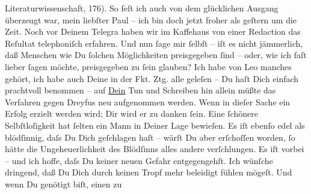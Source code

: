 \begin{ledgroupsized}[t]{13cm}
{{                        Literaturwissenschaft, 176).}  }\toendnotes[C]{\smallbreak}\pstart
           \noindent{}{\pb}So feſt ich auch von dem glücklichen Ausgang
               überzeugt war, mein liebſter Paul – ich bin doch jetzt froher als geſtern um die Zeit. Noch vor Deinem Telegra{\geminationm} haben wir im Kaffehaus von einer Redaction {\pb}das Reſultat telephoniſch erfahren. Und nun ſage mir
               ſelbſt – iſt es nicht jämmerlich, daß Menschen wie Du ſolchen Möglichkeiten
               preisgegeben ſind – oder, wie ich faſt lieber ſagen möchte, preisgegeben zu ſein
               glauben? Ich habe von Leo manches gehört, ich
               habe auch Deine \label{K_L02686-1v}\label{K_L02686-1h} in der Fkt. Ztg. alle geleſen – Du haſt
               Dich einfach prachtvoll benommen – auf \uline{Dein} Tun und
               Schreiben hin allein müßte das Verfahren gegen Dreyfus neu aufgenommen werden.\pend
           \pstart
           Wenn in dieſer Sache ein Erfolg erzielt werden wird; Dir wird er zu danken ſein. Eine
               ſchönere Selbſtloſig{\pb}keit hat ſelten ein Mann in
               Deiner Lage bewieſen. Es iſt ebenſo edel als blödſinnig, daſs Du Dich geſchlagen haſt
               – wärſt Du aber erſchoſſen worden, ſo hätte die Ungeheuerlichkeit des Blödſinns alles
               andere verſchlungen. Es iſt vorbei – und ich hoffe, daſs Du keiner neuen Gefahr
                  entgegen{\pb}gehſt. Ich wünſche dringend, daß Du Dich
               durch keinen Tropf mehr beleidigt fühlen mögeſt. Und wenn Du genötigt biſt, einen zu

\end{ledgroupsized}
